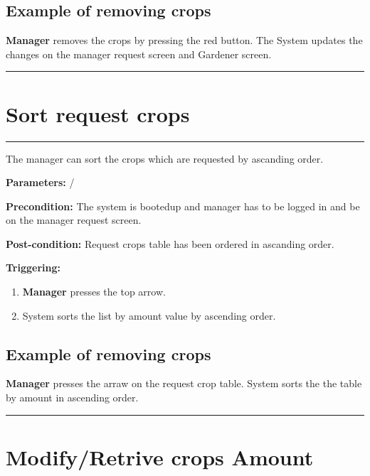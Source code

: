\subsection{Example of removing crops}
\textbf{Manager} removes the crops by pressing the red button. The System
updates the changes on the manager request screen and Gardener screen.
\hfill
\vspace{0.5cm}
\hrule


\break
\section{Sort request crops}

\hrule
\hfill
\vspace{0.5cm}

\label{operation:sortCropsRequest}

The manager can sort the crops which are requested by ascanding order.
\begin{description}

\item \textbf{Parameters:} /
\item \textbf{Precondition:} The system is bootedup and manager has to be
logged in and be on the manager request screen.
\item \textbf{Post-condition:} Request crops table has been ordered in ascanding
order.

\item \textbf{Triggering:}
\begin{enumerate}
\item \textbf{Manager} presses the top arrow.
\item System sorts the list by amount value by ascending order.
\end{enumerate}
\end{description}

\subsection{Example of removing crops}
\textbf{Manager} presses the arraw on the request crop table. System sorts the
the table by amount in ascending order.

\hfill
\vspace{0.5cm}
\hrule

\section{Modify/Retrive crops Amount}


